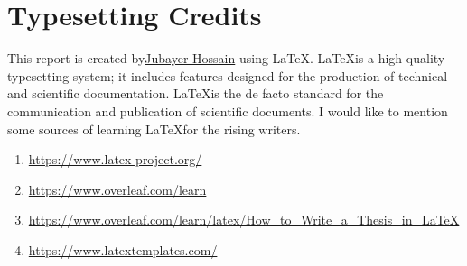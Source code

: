 \chapter*{Typesetting Credits}

This report is created by\href{https://www.linkedin.com/in/jubayer28/}{Jubayer Hossain} using \LaTeX. \LaTeX is a high-quality typesetting system; it includes features designed for the production of technical and scientific documentation. \LaTeX is the de facto standard for the communication and publication of scientific documents. I would like to mention some sources of learning \LaTeX for the rising writers. 

\begin{enumerate}
	\item \url{https://www.latex-project.org/}
	\item \url{https://www.overleaf.com/learn}
	\item\url{https://www.overleaf.com/learn/latex/How_to_Write_a_Thesis_in_LaTeX}
	\item \url{https://www.latextemplates.com/}
\end{enumerate}







